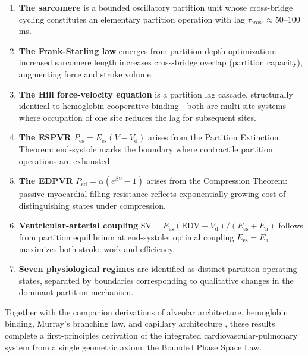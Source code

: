\documentclass[12pt,a4paper]{article}
\theoremstyle{remark}
\newcommand{\taucross}{\tau_{\mathrm{cross}}}
\newcommand{\Ees}{E_{\mathrm{es}}}
\newcommand{\Ea}{E_{\mathrm{a}}}
\newcommand{\Vd}{V_{\mathrm{d}}}
\newcommand{\Pes}{P_{\mathrm{es}}}
\newcommand{\Ped}{P_{\mathrm{ed}}}
\newcommand{\SV}{\mathrm{SV}}
\newcommand{\EDV}{\mathrm{EDV}}
\begin{document}
\begin{enumerate}
    \item \textbf{The sarcomere} is a bounded oscillatory partition unit whose cross-bridge cycling constitutes an elementary partition operation with lag $\taucross \approx 50$--$100$ ms.

    \item \textbf{The Frank-Starling law} emerges from partition depth optimization: increased sarcomere length increases cross-bridge overlap (partition capacity), augmenting force and stroke volume.

    \item \textbf{The Hill force-velocity equation} is a partition lag cascade, structurally identical to hemoglobin cooperative binding—both are multi-site systems where occupation of one site reduces the lag for subsequent sites.

    \item \textbf{The ESPVR} $\Pes = \Ees(V - \Vd)$ arises from the Partition Extinction Theorem: end-systole marks the boundary where contractile partition operations are exhausted.

    \item \textbf{The EDPVR} $\Ped = \alpha(e^{\beta V} - 1)$ arises from the Compression Theorem: passive myocardial filling resistance reflects exponentially growing cost of distinguishing states under compression.

    \item \textbf{Ventricular-arterial coupling} $\SV = \Ees(\EDV - \Vd)/(\Ees + \Ea)$ follows from partition equilibrium at end-systole; optimal coupling $\Ees = \Ea$ maximizes both stroke work and efficiency.

    \item \textbf{Seven physiological regimes} are identified as distinct partition operating states, separated by boundaries corresponding to qualitative changes in the dominant partition mechanism.
\end{enumerate}

Together with the companion derivations of alveolar architecture, hemoglobin binding, Murray's branching law, and capillary architecture \cite{sachikonye2024cardio}, these results complete a first-principles derivation of the integrated cardiovascular-pulmonary system from a single geometric axiom: the Bounded Phase Space Law.



\end{document}
